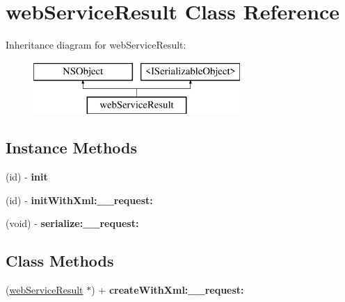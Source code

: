 \hypertarget{interfaceweb_service_result}{}\section{web\+Service\+Result Class Reference}
\label{interfaceweb_service_result}
Inheritance diagram for web\+Service\+Result\+:\begin{figure}[H]
\begin{center}
\leavevmode
\includegraphics[height=2.000000cm]{interfaceweb_service_result}
\end{center}
\end{figure}
\subsection*{Instance Methods}
\begin{DoxyCompactItemize}
\item 
\hypertarget{interfaceweb_service_result_a819dd62035f49180133495389b4634a2}{}(id) -\/ {\bfseries init}\label{interfaceweb_service_result_a819dd62035f49180133495389b4634a2}

\item 
\hypertarget{interfaceweb_service_result_a480ff87276a461c5226e77ec43d8f781}{}(id) -\/ {\bfseries init\+With\+Xml\+:\+\_\+\+\_\+request\+:}\label{interfaceweb_service_result_a480ff87276a461c5226e77ec43d8f781}

\item 
\hypertarget{interfaceweb_service_result_a321d37e5506df97b866da847b95d1fdc}{}(void) -\/ {\bfseries serialize\+:\+\_\+\+\_\+request\+:}\label{interfaceweb_service_result_a321d37e5506df97b866da847b95d1fdc}

\end{DoxyCompactItemize}
\subsection*{Class Methods}
\begin{DoxyCompactItemize}
\item 
\hypertarget{interfaceweb_service_result_ad9588e01b8d27bf2554c90f7e20bbd7a}{}(\hyperlink{interfaceweb_service_result}{web\+Service\+Result} $\ast$) + {\bfseries create\+With\+Xml\+:\+\_\+\+\_\+request\+:}\label{interfaceweb_service_result_ad9588e01b8d27bf2554c90f7e20bbd7a}

\end{DoxyCompactItemize}
